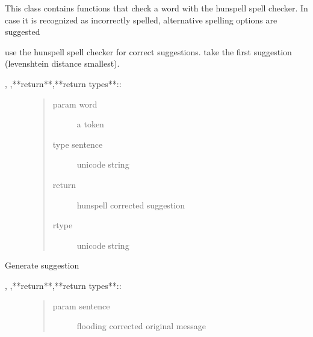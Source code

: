 \documentclass[letterpaper,10pt,english]{sphinxmanual}
\begin{document}
\begin{fulllineitems}
\label{\detokenize{API:norm.modules.spellcheck.Hunspell}}
This class contains functions that check a word with the hunspell spell checker.
In case it is recognized as incorrectly spelled, alternative spelling options are suggested

\begin{fulllineitems}
\label{\detokenize{API:norm.modules.spellcheck.Hunspell.find_suggestions}}
use the hunspell spell checker for correct suggestions. take the first suggestion (levenshtein distance smallest).
\begin{description}
\item[{, ,**return**,**return types**::}] \leavevmode\begin{quote}\begin{description}
\item[{param word}] \leavevmode
a token

\item[{type sentence}] \leavevmode
unicode string

\item[{return}] \leavevmode
hunspell corrected suggestion

\item[{rtype}] \leavevmode
unicode string

\end{description}\end{quote}

\end{description}

\end{fulllineitems}


\begin{fulllineitems}
\label{\detokenize{API:norm.modules.spellcheck.Hunspell.generate_alternatives}}
Generate suggestion
\begin{description}
\item[{, ,**return**,**return types**::}] \leavevmode\begin{quote}\begin{description}
\item[{param sentence}] \leavevmode
flooding corrected original message


\end{description}
\end{quote}
\end{description}
\end{fulllineitems}
\end{fulllineitems}
\end{document}
